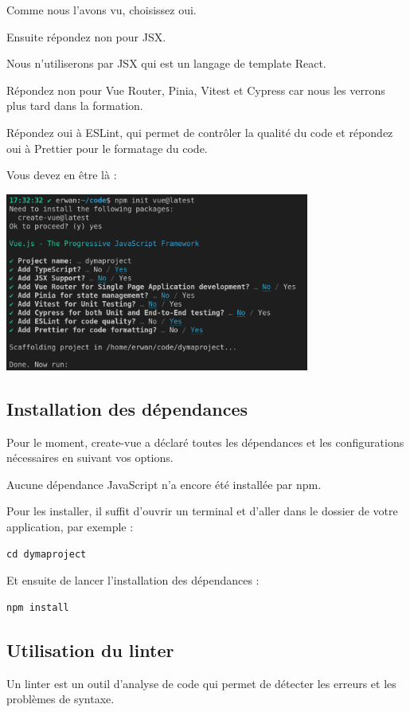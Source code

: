 \documentclass{article}
\begin{document}
Comme nous l'avons vu, choisissez oui.

Ensuite répondez non pour JSX.

Nous n'utiliserons par JSX qui est un langage de template React.

Répondez non pour Vue Router, Pinia, Vitest et Cypress car nous les verrons plus tard dans la formation.

Répondez oui à ESLint, qui permet de contrôler la qualité du code et répondez oui à Prettier pour le formatage du code.

Vous devez en être là :
\begin{center}
\includegraphics[width=10cm]{images/image04.png}
\end{center}

\subsection{Installation des dépendances}
Pour le moment, create-vue a déclaré toutes les dépendances et les configurations nécessaires en suivant vos options.

Aucune dépendance JavaScript n'a encore été installée par npm.

Pour les installer, il suffit d'ouvrir un terminal et d'aller dans le dossier de votre application, par exemple :
\begin{verbatim}
cd dymaproject
\end{verbatim}

Et ensuite de lancer l'installation des dépendances :
\begin{verbatim}
npm install
\end{verbatim}

\subsection{Utilisation du linter}
Un linter est un outil d'analyse de code qui permet de détecter les erreurs et les problèmes de syntaxe.
\end{document}
